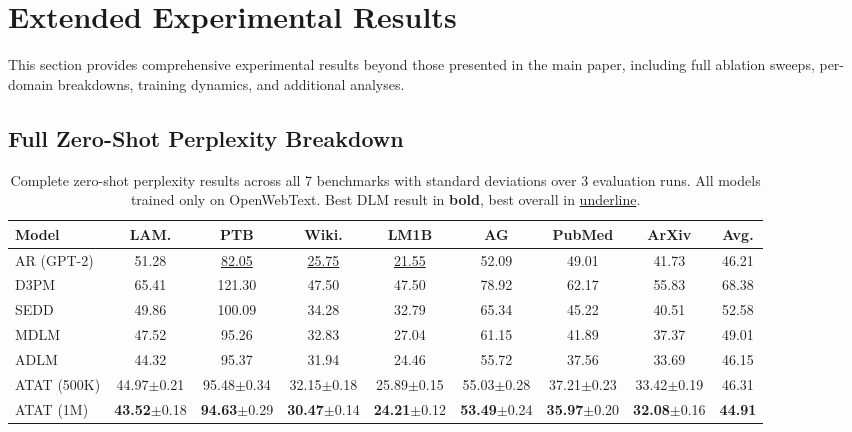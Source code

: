 \section{Extended Experimental Results}
\label{app:experiments}

This section provides comprehensive experimental results beyond those presented in the main paper, including full ablation sweeps, per-domain breakdowns, training dynamics, and additional analyses.

\subsection{Full Zero-Shot Perplexity Breakdown}

\begin{table}[h]
\centering
\caption{Complete zero-shot perplexity results across all 7 benchmarks with standard deviations over 3 evaluation runs. All models trained only on OpenWebText. Best DLM result in \textbf{bold}, best overall in \underline{underline}.}
\label{tab:zero-shot-full}
\begin{tabular}{lccccccc|c}
\toprule
\textbf{Model} & \textbf{LAM.} & \textbf{PTB} & \textbf{Wiki.} & \textbf{LM1B} & \textbf{AG} & \textbf{PubMed} & \textbf{ArXiv} & \textbf{Avg.} \\
\midrule
AR (GPT-2) & 51.28 & \underline{82.05} & \underline{25.75} & \underline{21.55} & 52.09 & 49.01 & 41.73 & 46.21 \\
\midrule
D3PM & 65.41 & 121.30 & 47.50 & 47.50 & 78.92 & 62.17 & 55.83 & 68.38 \\
SEDD & 49.86 & 100.09 & 34.28 & 32.79 & 65.34 & 45.22 & 40.51 & 52.58 \\
MDLM & 47.52 & 95.26 & 32.83 & 27.04 & 61.15 & 41.89 & 37.37 & 49.01 \\
ADLM & 44.32 & 95.37 & 31.94 & 24.46 & 55.72 & 37.56 & 33.69 & 46.15 \\
\midrule
ATAT (500K) & 44.97{\scriptsize$\pm$0.21} & 95.48{\scriptsize$\pm$0.34} & 32.15{\scriptsize$\pm$0.18} & 25.89{\scriptsize$\pm$0.15} & 55.03{\scriptsize$\pm$0.28} & 37.21{\scriptsize$\pm$0.23} & 33.42{\scriptsize$\pm$0.19} & 46.31 \\
ATAT (1M) & \textbf{43.52}{\scriptsize$\pm$0.18} & \textbf{94.63}{\scriptsize$\pm$0.29} & \textbf{30.47}{\scriptsize$\pm$0.14} & \textbf{24.21}{\scriptsize$\pm$0.12} & \textbf{53.49}{\scriptsize$\pm$0.24} & \textbf{35.97}{\scriptsize$\pm$0.20} & \textbf{32.08}{\scriptsize$\pm$0.16} & \textbf{44.91} \\
\bottomrule
\end{tabular}
\end{table}

